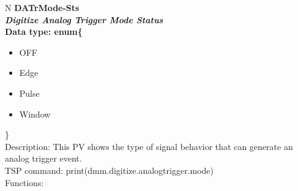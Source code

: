 \documentclass[openany]{article}
\begin{document}
		\begin{tabular}{N}
			\hline
			\bfseries DATrMode-Sts\label{pv:datrmode-sts} \\ \hline
			\emph{Digitize Analog Trigger Mode Status} \\
			Data type: enum\{\begin{itemize}[noitemsep]
				\small
				\item[] OFF
				\item[] Edge
				\item[] Pulse
				\item[] Window
			\end{itemize}\} \\
			Description: This PV shows the type of signal behavior that can generate an analog trigger event. \\
			TSP command: print(dmm.digitize.analogtrigger.mode) \\
			Functions: \\
			\arrayrulecolor{\FuncTableBorderColor}

		\end{tabular}
\end{document}
